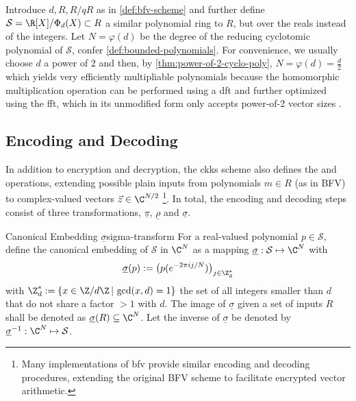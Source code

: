 
Introduce $d, R, R/qR$ as in \autoref{def:bfv-scheme} and further define $\mathcal{S} = \R[X] / \Phi_d(X) \subset R$ a similar polynomial ring to $R$, but over the reals instead of the integers.
Let $N = \varphi(d)$ be the degree of the reducing cyclotomic polynomial of $\mathcal{S}$, confer \autoref{def:bounded-polynomials}.
For convenience, we usually choose $d$ a power of $2$ and then, by \autoref{thm:power-of-2-cyclo-poly}, $N = \varphi(d) = \frac{d}{2}$ which yields very efficiently multipliable polynomials because the homomorphic multiplication operation can be performed using a \gls{dft} and further optimized using the \gls{fft}, which in its unmodified form only accepts power-of-2 vector sizes \parencite{2017-ckks-original}.

\subsection{Encoding and Decoding}
In addition to encryption and decryption, the \gls{ckks} scheme also defines the  and  operations, extending possible plain inputs from polynomials $m \in R$ (as in BFV) to complex-valued vectors $\vec{z} \in \C^{N/2}$
\footnote{Many implementations of \gls{bfv} provide similar encoding and decoding procedures, extending the original BFV scheme \parencite{2012-fv-original} to facilitate encrypted vector arithmetic.}.
In total, the encoding and decoding steps consist of three transformations, $\underline{\pi}$, $\underline{\rho}$ and $\underline{\sigma}$.

\begin{definition}{Canonical Embedding $\underline{\sigma}$}{sigma-transform}
  For a real-valued polynomial $p \in \mathcal{S}$, define the canonical embedding of $\mathcal{S}$ in $\C^N$ as a mapping $\underline{\sigma}: \mathcal{S} \mapsto \C^N$ with $$\underline{\sigma}(p) := \big(p(e^{-2\pi i j / N})\big)_{j \in \Z_d^*}$$
  with $\Z_d^* := \{x \in \Z / d\Z \,|\, \gcd(x, d) = 1\}$ the set of all integers smaller than $d$ that do not share a factor $> 1$ with $d$.
  The image of $\underline{\sigma}$ given a set of inputs $R$ shall be denoted as $\underline{\sigma}(R) \subseteq \C^N$.
  Let the inverse of $\underline{\sigma}$ be denoted by $\underline{\sigma}\inv: \C^N \mapsto \mathcal{S}$.
\end{definition}


